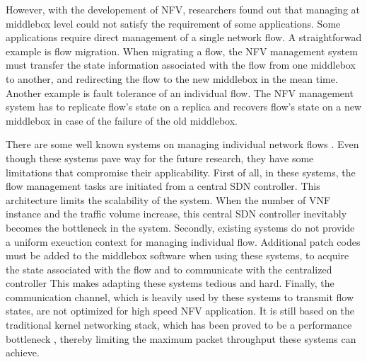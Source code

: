 However, with the developement of NFV, researchers found out that managing at middlebox level could not satisfy the requirement of some applications. Some applications require direct management of a single network flow. A straightforwad example is flow migration. When migrating a flow, the NFV management system must transfer the state information associated with the flow from one middlebox to another, and redirecting the flow to the new middlebox in the mean time. Another example is fault tolerance of an individual flow. The NFV management system has to replicate flow's state on a replica and recovers flow's state on a new middlebox in case of the failure of the old middlebox.


There are some well known systems on managing individual network flows \cite{gember2015opennf, rajagopalan2013split, khalid2016paving}. Even though these systems pave way for the future research, they have some limitations that compromise their applicability. First of all, in these systems, the flow management tasks are initiated from a central SDN controller. This architecture limits the scalability of the system. When the number of VNF instance and the traffic volume increase, this central SDN controller inevitably becomes the bottleneck in the system. Secondly, existing systems do not provide a uniform exeuction context for managing individual flow. Additional patch codes must be added to the middlebox software when using these systems, to acquire the state associated with the flow and to communicate with the centralized controller This makes adapting these systems tedious and hard. Finally, the communication channel, which is heavily used by these systems to transmit flow states, are not optimized for high speed NFV application. It is still based on the traditional kernel networking stack, which has been proved to be a performance bottleneck \cite{martins2014clickos}, thereby limiting the maximum packet throughput these systems can achieve.


